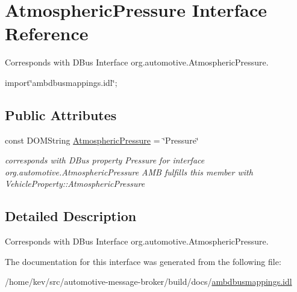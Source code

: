 \hypertarget{interfaceAtmosphericPressure}{\section{Atmospheric\+Pressure Interface Reference}
\label{interfaceAtmosphericPressure}
}


Corresponds with D\+Bus Interface org.\+automotive.\+Atmospheric\+Pressure.  




{\ttfamily import\char`\"{}ambdbusmappings.\+idl\char`\"{};}

\subsection*{Public Attributes}
\begin{DoxyCompactItemize}
\item 
\hypertarget{interfaceAtmosphericPressure_a32fe278d370cc25bb8ce6485f9654ecf}{const D\+O\+M\+String \hyperlink{interfaceAtmosphericPressure_a32fe278d370cc25bb8ce6485f9654ecf}{Atmospheric\+Pressure} = \char`\"{}Pressure\char`\"{}}\label{interfaceAtmosphericPressure_a32fe278d370cc25bb8ce6485f9654ecf}

\begin{DoxyCompactList}\small\item\em corresponds with D\+Bus property Pressure for interface org.\+automotive.\+Atmospheric\+Pressure A\+M\+B fulfills this member with Vehicle\+Property\+::\+Atmospheric\+Pressure \end{DoxyCompactList}\end{DoxyCompactItemize}


\subsection{Detailed Description}
Corresponds with D\+Bus Interface org.\+automotive.\+Atmospheric\+Pressure. 

The documentation for this interface was generated from the following file\+:\begin{DoxyCompactItemize}
\item 
/home/kev/src/automotive-\/message-\/broker/build/docs/\hyperlink{ambdbusmappings_8idl}{ambdbusmappings.\+idl}\end{DoxyCompactItemize}
